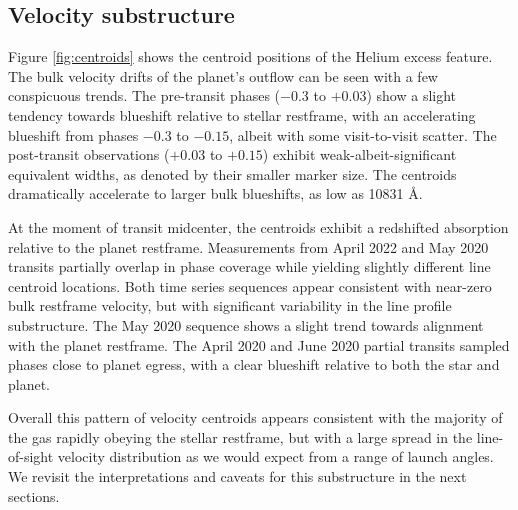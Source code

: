 \documentclass[twocolumn]{aastex631}
\begin{document}
\subsection{Velocity substructure}
Figure \ref{fig:centroids} shows the centroid positions of the Helium excess feature.  The bulk velocity drifts of the planet's outflow can be seen with a few conspicuous trends.  The pre-transit phases ($-0.3$ to $+0.03$) show a slight tendency towards blueshift relative to stellar restframe, with an accelerating blueshift from phases $-0.3$ to $-0.15$, albeit with some visit-to-visit scatter.  The post-transit observations ($+0.03$ to $+0.15$) exhibit weak-albeit-significant equivalent widths, as denoted by their smaller marker size.  The centroids dramatically accelerate to larger bulk blueshifts, as low as 10831 \AA.

At the moment of transit midcenter, the centroids exhibit a redshifted absorption relative to the planet restframe. Measurements from April 2022 and May 2020 transits partially overlap in phase coverage while yielding slightly different line centroid locations.  Both time series sequences appear consistent with near-zero bulk restframe velocity, but with significant variability in the line profile substructure.  The May 2020 sequence shows a slight trend towards alignment with the planet restframe.  The April 2020 and June 2020 partial transits sampled phases close to planet egress, with a clear blueshift relative to both the star and planet.

Overall this pattern of velocity centroids appears consistent with the majority of the gas rapidly obeying the stellar restframe, but with a large spread in the line-of-sight velocity distribution as we would expect from a range of launch angles.  We revisit the interpretations and caveats for this substructure in the next sections.
\end{document}
